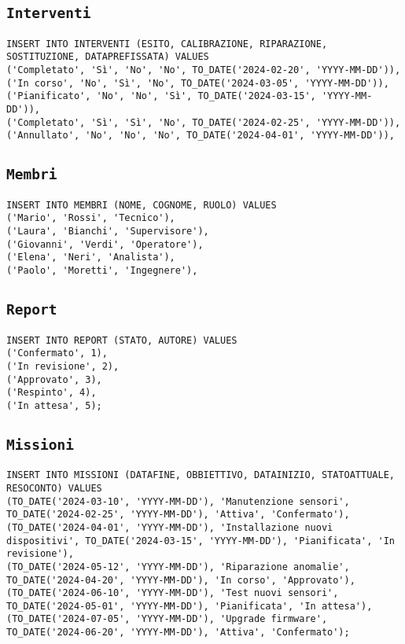 \subsection{\texttt{Interventi}}
\begin{verbatim}
INSERT INTO INTERVENTI (ESITO, CALIBRAZIONE, RIPARAZIONE, SOSTITUZIONE, DATAPREFISSATA) VALUES 
('Completato', 'Sì', 'No', 'No', TO_DATE('2024-02-20', 'YYYY-MM-DD')),
('In corso', 'No', 'Sì', 'No', TO_DATE('2024-03-05', 'YYYY-MM-DD')),
('Pianificato', 'No', 'No', 'Sì', TO_DATE('2024-03-15', 'YYYY-MM-DD')),
('Completato', 'Sì', 'Sì', 'No', TO_DATE('2024-02-25', 'YYYY-MM-DD')),
('Annullato', 'No', 'No', 'No', TO_DATE('2024-04-01', 'YYYY-MM-DD')),
\end{verbatim}
\subsection{\texttt{Membri}}
\begin{verbatim}
INSERT INTO MEMBRI (NOME, COGNOME, RUOLO) VALUES
('Mario', 'Rossi', 'Tecnico'),
('Laura', 'Bianchi', 'Supervisore'),
('Giovanni', 'Verdi', 'Operatore'),
('Elena', 'Neri', 'Analista'),
('Paolo', 'Moretti', 'Ingegnere'),
\end{verbatim}
\subsection{\texttt{Report}}
\begin{verbatim}
INSERT INTO REPORT (STATO, AUTORE) VALUES 
('Confermato', 1),
('In revisione', 2),
('Approvato', 3),
('Respinto', 4),
('In attesa', 5);
\end{verbatim}
\subsection{\texttt{Missioni}}
\begin{verbatim}
INSERT INTO MISSIONI (DATAFINE, OBBIETTIVO, DATAINIZIO, STATOATTUALE, RESOCONTO) VALUES 
(TO_DATE('2024-03-10', 'YYYY-MM-DD'), 'Manutenzione sensori', TO_DATE('2024-02-25', 'YYYY-MM-DD'), 'Attiva', 'Confermato'),
(TO_DATE('2024-04-01', 'YYYY-MM-DD'), 'Installazione nuovi dispositivi', TO_DATE('2024-03-15', 'YYYY-MM-DD'), 'Pianificata', 'In revisione'),
(TO_DATE('2024-05-12', 'YYYY-MM-DD'), 'Riparazione anomalie', TO_DATE('2024-04-20', 'YYYY-MM-DD'), 'In corso', 'Approvato'),
(TO_DATE('2024-06-10', 'YYYY-MM-DD'), 'Test nuovi sensori', TO_DATE('2024-05-01', 'YYYY-MM-DD'), 'Pianificata', 'In attesa'),
(TO_DATE('2024-07-05', 'YYYY-MM-DD'), 'Upgrade firmware', TO_DATE('2024-06-20', 'YYYY-MM-DD'), 'Attiva', 'Confermato');
\end{verbatim}

